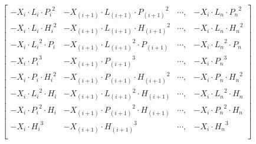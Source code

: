 \documentclass[10pt]{report}
\begin{document}
\begin{equation}
\begin{bmatrix}
-{X_i} \cdot L_i \cdot {P_i}^2        & -{X_{(i+1)}} \cdot L_{(i+1)} \cdot {P_{(i+1)}}^2              & \cdots, & -{X_i} \cdot L_n \cdot {P_n}^2       \\[4pt]
-{X_i} \cdot L_i \cdot {H_i}^2        & -{X_{(i+1)}} \cdot L_{(i+1)} \cdot {H_{(i+1)}}^2              & \cdots, & -{X_i} \cdot L_n \cdot {H_n}^2       \\[4pt]
-{X_i} \cdot {L_i}^2 \cdot P_i        & -{X_{(i+1)}} \cdot {L_{(i+1)}}^2 \cdot P_{(i+1)}              & \cdots, & -{X_i} \cdot {L_n}^2 \cdot P_n       \\[4pt]
-{X_i} \cdot {P_i}^3                  & -{X_{(i+1)}} \cdot {P_{(i+1)}}^3                              & \cdots, & -{X_i} \cdot {P_n}^3                 \\[4pt]
-{X_i} \cdot P_i \cdot {H_i}^2        & -{X_{(i+1)}} \cdot P_{(i+1)} \cdot {H_{(i+1)}}^2              & \cdots, & -{X_i} \cdot P_n \cdot {H_n}^2       \\[4pt]
-{X_i} \cdot {L_i}^2 \cdot H_i        & -{X_{(i+1)}} \cdot {L_{(i+1)}}^2 \cdot H_{(i+1)}              & \cdots, & -{X_i} \cdot {L_n}^2 \cdot H_n       \\[4pt]
-{X_i} \cdot {P_i}^2 \cdot H_i        & -{X_{(i+1)}} \cdot {P_{(i+1)}}^2 \cdot H_{(i+1)}              & \cdots, & -{X_i} \cdot {P_n}^2 \cdot H_n       \\[4pt]
-{X_i} \cdot {H_i}^3        & -{X_{(i+1)}} \cdot {H_{(i+1)}}^3              & \cdots, & -{X_i} \cdot {H_n}^3                                           \\[4pt]


\end{bmatrix}
\end{equation}
\end{document}
